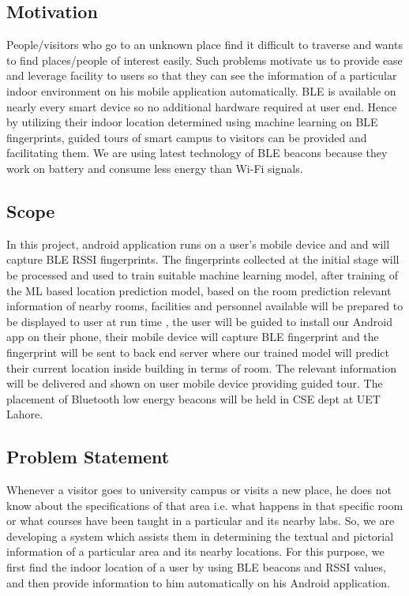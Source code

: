 \documentclass{article}
\begin{document}
\subsection{Motivation}
People/visitors who go to an unknown place find it difficult to traverse and wants to find places/people of interest easily. Such problems motivate us to provide ease and leverage facility to users so that they can see the information of a particular indoor environment on his mobile application automatically. BLE is available on nearly every smart device so no additional hardware required at user end. Hence by utilizing their indoor location determined using machine learning on BLE fingerprints, guided tours of smart campus to visitors can be provided and facilitating them. We are using latest technology of BLE beacons because they work on battery and consume less energy than Wi-Fi signals\cite{hultgren2015evaluating}.

\subsection{Scope}
In this project, android application runs on a user’s mobile device and and will capture BLE RSSI fingerprints. The fingerprints collected at the initial stage will be processed and used to train suitable machine learning model, after training of the ML based location prediction model, based on the room prediction relevant information of nearby rooms, facilities and personnel available will be prepared to be displayed to user at run time , the user will be guided to install our Android app on their phone, their mobile device will capture BLE fingerprint and the fingerprint will be sent to back end server where our trained model will predict their current location inside building in terms of room\cite{Loco}. The relevant information will be delivered and shown on user mobile device providing guided tour. 
The placement of Bluetooth low energy beacons will be held in CSE dept at UET Lahore. 

\subsection{Problem Statement}
Whenever a visitor goes to university campus or visits a new place, he does not know about the specifications of that area i.e. what happens in that specific room or what courses have been taught in a particular and its nearby labs. So, we are developing a system which assists them in determining the textual and pictorial information of a particular area and its nearby locations. For this purpose, we first find the indoor location of a user by using BLE beacons and RSSI values, and then provide information to him automatically on his Android application. 
\end{document}
